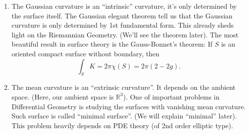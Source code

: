 \begin{remark}\hfill
\begin{enumerate}[(1)]
    \item 
    The Gaussian curvature is an ``intrinsic'' curvature, it's only determined
    by the surface itself. The Gaussian elegant theorem tell us that the Gaussian
    curvature is only determined by 1st fundamental form. This already sheds light
    on the Riemannian Geometry. (We'll see the theorem later). The most beautiful
    result in surface theory is the Gauss-Bonnet's theorem: If \(S\) is an oriented
    compact surface without boundary, then \[
        \int_{S}K = 2\pi\chi(S)=2\pi(2-2g)
    .\]
    \item 
    The mean curvature is an ``extrinsic curvature''. It depends on the ambient
    space. (Here, our ambient space is \(\mathbb{R}^3\)). One of important problems
    in Differential Geometry is studying the surfaces with vanishing mean curvature.
    Such surface is called ``minimal surface''. (We will explain ``minimal'' later).
    This problem heavily depends on PDE theory (of 2nd order elliptic type).
\end{enumerate}
\end{remark}

